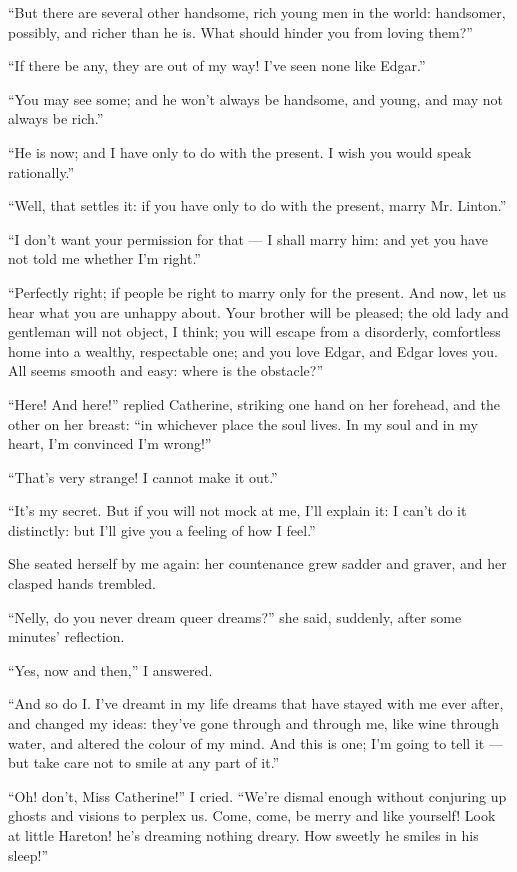 \par “But there are several other handsome, rich young men in the world: handsomer, possibly, and richer than he is. What should hinder you from loving them?”
\par “If there be any, they are out of my way! I've seen none like Edgar.”
\par “You may see some; and he won't always be handsome, and young, and may not always be rich.”
\par “He is now; and I have only to do with the present. I wish you would speak rationally.”
\par “Well, that settles it: if you have only to do with the present, marry Mr. Linton.”
\par “I don't want your permission for that — I shall marry him: and yet you have not told me whether I'm right.”
\par “Perfectly right; if people be right to marry only for the present. And now, let us hear what you are unhappy about. Your brother will be pleased; the old lady and gentleman will not object, I think; you will escape from a disorderly, comfortless home into a wealthy, respectable one; and you love Edgar, and Edgar loves you. All seems smooth and easy: where is the obstacle?”
\par “Here! And here!” replied Catherine, striking one hand on her forehead, and the other on her breast: “in whichever place the soul lives. In my soul and in my heart, I'm convinced I'm wrong!”
\par “That's very strange! I cannot make it out.”
\par “It's my secret. But if you will not mock at me, I'll explain it: I can't do it distinctly: but I'll give you a feeling of how I feel.”
\par She seated herself by me again: her countenance grew sadder and graver, and her clasped hands trembled.
\par “Nelly, do you never dream queer dreams?” she said, suddenly, after some minutes' reflection.
\par “Yes, now and then,” I answered.
\par “And so do I. I've dreamt in my life dreams that have stayed with me ever after, and changed my ideas: they've gone through and through me, like wine through water, and altered the colour of my mind. And this is one; I'm going to tell it — but take care not to smile at any part of it.”
\par “Oh! don't, Miss Catherine!” I cried. “We're dismal enough without conjuring up ghosts and visions to perplex us. Come, come, be merry and like yourself! Look at little Hareton! he's dreaming nothing dreary. How sweetly he smiles in his sleep!”
